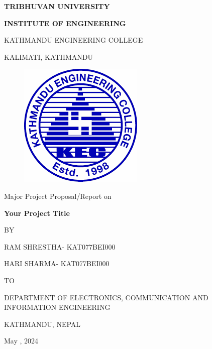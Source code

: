 \begin{titlepage}
    \thispagestyle{empty}
    \begin{center}
    
    \vspace*{\fill} %
    {\large \textbf{TRIBHUVAN UNIVERSITY
}\par}
{\large \textbf{INSTITUTE OF ENGINEERING
}\par}
\vspace{8pt}
KATHMANDU ENGINEERING COLLEGE

KALIMATI, KATHMANDU
\vspace{24pt}

\begin{figure}[ht]
    \centering
    \includegraphics[scale=0.45]{images/kec.png}
\end{figure}
\vspace{24pt}
{Major Project Proposal/Report on\par}
\vspace{14pt}
{\textbf{ Your Project Title}\par}

\vspace{14pt}
{BY\par}
\vspace{14pt}
    
{RAM SHRESTHA- KAT077BEI000\par}
{HARI SHARMA- KAT077BEI000\par}

\vspace{24pt}
{TO\par}
\vspace{14pt}
{DEPARTMENT OF ELECTRONICS, COMMUNICATION AND INFORMATION ENGINEERING\par}
{KATHMANDU, NEPAL\par}
{May , 2024\par}

    \vspace*{\fill}

    \end{center}
\end{titlepage}